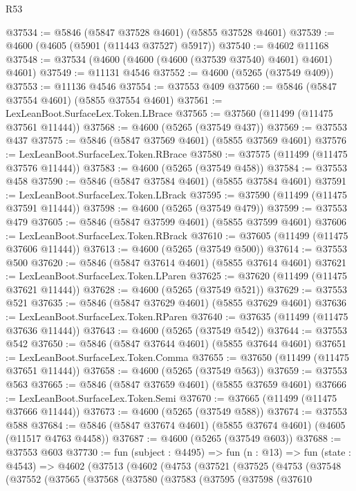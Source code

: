 \begin{lexlean}{R53}
\begin{coremodule}
@37534 := @5846 (@5847 @37528 @4601) (@5855 @37528 @4601)
@37539 := @4600 (@4605 (@5901 (@11443 @37527) @5917))
@37540 := @4602 @11168
@37548 := @37534 (@4600 (@4600 (@4600 (@37539 @37540) @4601) @4601) @4601)
@37549 := @11131 @4546
@37552 := @4600 (@5265 (@37549 @409))
@37553 := @11136 @4546
@37554 := @37553 @409
@37560 := @5846 (@5847 @37554 @4601) (@5855 @37554 @4601)
@37561 := LexLeanBoot.SurfaceLex.Token.LBrace
@37565 := @37560 (@11499 (@11475 @37561 @11444))
@37568 := @4600 (@5265 (@37549 @437))
@37569 := @37553 @437
@37575 := @5846 (@5847 @37569 @4601) (@5855 @37569 @4601)
@37576 := LexLeanBoot.SurfaceLex.Token.RBrace
@37580 := @37575 (@11499 (@11475 @37576 @11444))
@37583 := @4600 (@5265 (@37549 @458))
@37584 := @37553 @458
@37590 := @5846 (@5847 @37584 @4601) (@5855 @37584 @4601)
@37591 := LexLeanBoot.SurfaceLex.Token.LBrack
@37595 := @37590 (@11499 (@11475 @37591 @11444))
@37598 := @4600 (@5265 (@37549 @479))
@37599 := @37553 @479
@37605 := @5846 (@5847 @37599 @4601) (@5855 @37599 @4601)
@37606 := LexLeanBoot.SurfaceLex.Token.RBrack
@37610 := @37605 (@11499 (@11475 @37606 @11444))
@37613 := @4600 (@5265 (@37549 @500))
@37614 := @37553 @500
@37620 := @5846 (@5847 @37614 @4601) (@5855 @37614 @4601)
@37621 := LexLeanBoot.SurfaceLex.Token.LParen
@37625 := @37620 (@11499 (@11475 @37621 @11444))
@37628 := @4600 (@5265 (@37549 @521))
@37629 := @37553 @521
@37635 := @5846 (@5847 @37629 @4601) (@5855 @37629 @4601)
@37636 := LexLeanBoot.SurfaceLex.Token.RParen
@37640 := @37635 (@11499 (@11475 @37636 @11444))
@37643 := @4600 (@5265 (@37549 @542))
@37644 := @37553 @542
@37650 := @5846 (@5847 @37644 @4601) (@5855 @37644 @4601)
@37651 := LexLeanBoot.SurfaceLex.Token.Comma
@37655 := @37650 (@11499 (@11475 @37651 @11444))
@37658 := @4600 (@5265 (@37549 @563))
@37659 := @37553 @563
@37665 := @5846 (@5847 @37659 @4601) (@5855 @37659 @4601)
@37666 := LexLeanBoot.SurfaceLex.Token.Semi
@37670 := @37665 (@11499 (@11475 @37666 @11444))
@37673 := @4600 (@5265 (@37549 @588))
@37674 := @37553 @588
@37684 := @5846 (@5847 @37674 @4601) (@5855 @37674 @4601) (@4605 (@11517 @4763 @4458))
@37687 := @4600 (@5265 (@37549 @603))
@37688 := @37553 @603
@37730 := fun (subject : @4495) =>
  fun (n : @13) =>
  fun (state : @4543) =>
  @4602
    (@37513
      (@4602
        (@4753
          (@37521
            (@37525
              (@4753
                (@37548
                  (@37552
                    (@37565
                      (@37568
                        (@37580
                          (@37583
                            (@37595
                              (@37598
                                (@37610

\end{coremodule}
\end{lexlean}
